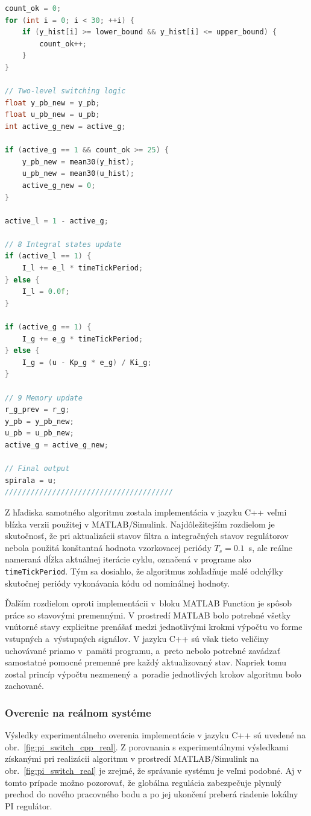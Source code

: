 \begin{lstlisting}[language=C++, caption={Implementácia prepínacej logiky v hlavnom regulačnom cykle programu}, label={lst:pi_switch_cpp_code}]
count_ok = 0;
for (int i = 0; i < 30; ++i) {
    if (y_hist[i] >= lower_bound && y_hist[i] <= upper_bound) {
        count_ok++;
    }
}

// Two-level switching logic
float y_pb_new = y_pb;
float u_pb_new = u_pb;
int active_g_new = active_g;

if (active_g == 1 && count_ok >= 25) {
    y_pb_new = mean30(y_hist);
    u_pb_new = mean30(u_hist);
    active_g_new = 0;
}

active_l = 1 - active_g;

// 8 Integral states update
if (active_l == 1) {
    I_l += e_l * timeTickPeriod;
} else {
    I_l = 0.0f;
}

if (active_g == 1) {
    I_g += e_g * timeTickPeriod;
} else {
    I_g = (u - Kp_g * e_g) / Ki_g;
}

// 9 Memory update
r_g_prev = r_g;
y_pb = y_pb_new;
u_pb = u_pb_new;
active_g = active_g_new;

// Final output
spirala = u;
///////////////////////////////////////
\end{lstlisting}

Z hľadiska samotného algoritmu
zostala implementácia v jazyku C++
veľmi blízka verzii použitej v MATLAB/Simulink.
Najdôležitejším rozdielom je skutočnosť,
že pri aktualizácii stavov filtra
a integračných stavov regulátorov
nebola použitá konštantná hodnota
vzorkovacej periódy $T_s = 0.1$~s,
ale reálne nameraná dĺžka aktuálnej iterácie cyklu,
označená v programe ako \texttt{timeTickPeriod}.
Tým sa dosiahlo,
že algoritmus zohľadňuje malé odchýlky
skutočnej periódy vykonávania kódu
od nominálnej hodnoty.

Ďalším rozdielom oproti implementácii
v~bloku MATLAB Function je spôsob práce
so stavovými premennými.
V prostredí MATLAB bolo potrebné všetky vnútorné stavy
explicitne prenášať medzi jednotlivými krokmi výpočtu
vo forme vstupných a~výstupných signálov.
V jazyku C++ sú však tieto veličiny
uchovávané priamo v~pamäti programu,
a~preto nebolo potrebné zavádzať
samostatné pomocné premenné
pre každý aktualizovaný stav.
Napriek tomu zostal princíp výpočtu nezmenený
a~poradie jednotlivých krokov algoritmu
bolo zachované.

\subsubsection{Overenie na reálnom systéme}
\label{sec:prep_matlab_experiment}

Výsledky experimentálneho overenia
implementácie v jazyku C++
sú uvedené na obr.~\ref{fig:pi_switch_cpp_real}.
Z porovnania s experimentálnymi výsledkami
získanými pri realizácii algoritmu
v prostredí MATLAB/Simulink
na obr.~\ref{fig:pi_switch_real}
je zrejmé,
že správanie systému je veľmi podobné.
Aj v tomto prípade možno pozorovať,
že globálna regulácia zabezpečuje plynulý prechod
do nového pracovného bodu
a po jej ukončení preberá riadenie
lokálny PI regulátor.

